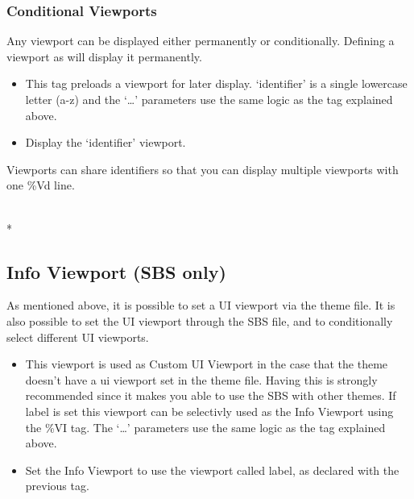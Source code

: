 \subsubsection{Conditional Viewports}

Any viewport can be displayed either permanently or conditionally.
Defining a viewport as 
will display it permanently.

\begin{itemize}
\item {}
This tag preloads a viewport for later display. `identifier' is a single
lowercase letter (a-z) and the `\dots' parameters use the same logic as
the  tag explained above.
\item {} Display the `identifier' viewport.
\end{itemize}

Viewports can share identifiers so that you can display multiple viewports
with one \%Vd line.

\\*


\subsection{Info Viewport (SBS only)}
As mentioned above, it is possible to set a UI viewport via the theme
 file. It is also possible to set the UI viewport through the SBS
file, and to conditionally select different UI viewports.

  \begin{itemize}
    \item {}
    This viewport is used as Custom UI Viewport in the case that the theme
    doesn't have a ui viewport set in the theme  file. Having this
    is strongly recommended since it makes you able to use the SBS
    with other themes. If label is set this viewport can be selectivly used as the
    Info Viewport using the \%VI tag. The `\dots' parameters use the same logic as
    the  tag explained above.

    \item {} Set the Info Viewport to use the viewport called
    label, as declared with the previous tag.
  \end{itemize}

